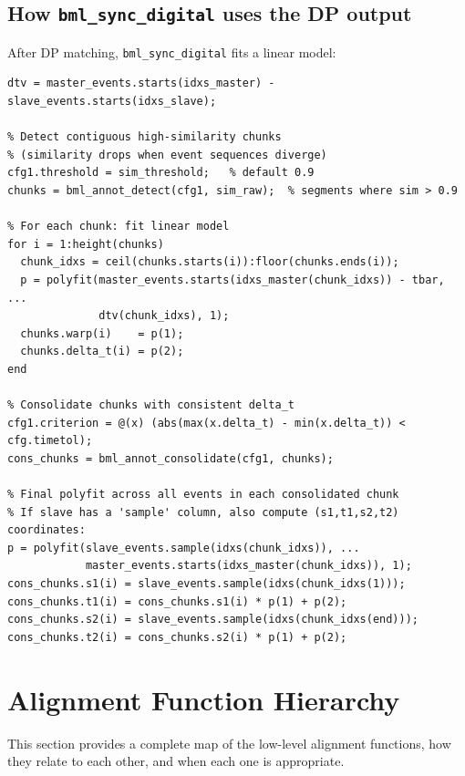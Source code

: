 \documentclass[11pt, a4paper]{article}
\begin{document}
\subsection{How \texttt{bml\_sync\_digital} uses the DP output}

After DP matching, \texttt{bml\_sync\_digital} fits a linear model:

\begin{lstlisting}[style=matlab]
% dtv = time differences for all matched pairs
dtv = master_events.starts(idxs_master) - slave_events.starts(idxs_slave);

% Detect contiguous high-similarity chunks
% (similarity drops when event sequences diverge)
cfg1.threshold = sim_threshold;   % default 0.9
chunks = bml_annot_detect(cfg1, sim_raw);  % segments where sim > 0.9

% For each chunk: fit linear model
for i = 1:height(chunks)
  chunk_idxs = ceil(chunks.starts(i)):floor(chunks.ends(i));
  p = polyfit(master_events.starts(idxs_master(chunk_idxs)) - tbar, ...
              dtv(chunk_idxs), 1);
  chunks.warp(i)    = p(1);
  chunks.delta_t(i) = p(2);
end

% Consolidate chunks with consistent delta_t
cfg1.criterion = @(x) (abs(max(x.delta_t) - min(x.delta_t)) < cfg.timetol);
cons_chunks = bml_annot_consolidate(cfg1, chunks);

% Final polyfit across all events in each consolidated chunk
% If slave has a 'sample' column, also compute (s1,t1,s2,t2) coordinates:
p = polyfit(slave_events.sample(idxs(chunk_idxs)), ...
            master_events.starts(idxs_master(chunk_idxs)), 1);
cons_chunks.s1(i) = slave_events.sample(idxs(chunk_idxs(1)));
cons_chunks.t1(i) = cons_chunks.s1(i) * p(1) + p(2);
cons_chunks.s2(i) = slave_events.sample(idxs(chunk_idxs(end)));
cons_chunks.t2(i) = cons_chunks.s2(i) * p(1) + p(2);
\end{lstlisting}

\section{Alignment Function Hierarchy}
\label{sec:alignment_hierarchy}

This section provides a complete map of the low-level alignment functions, how they relate to each other, and when each one is appropriate.
\end{document}
